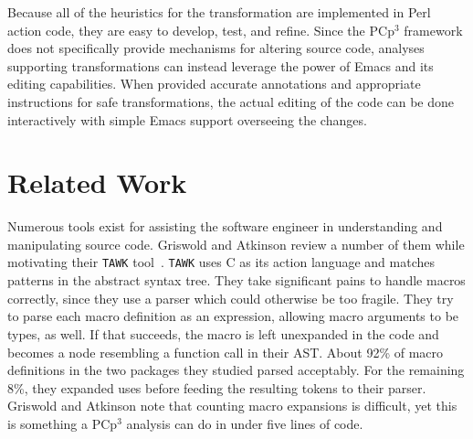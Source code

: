 \documentclass{article}
\newcommand{\pcp}{\mbox{\textsf{PCp}$^3$}}
\newcommand{\Perl}{\mbox{Perl}}
\newcommand{\C}{\mbox{C}}
\begin{document}
Because all of the heuristics for the transformation are implemented in
\Perl{} action code, they are easy to develop, test, and refine.  Since
the \pcp{} framework does not specifically provide mechanisms for
altering source code, analyses supporting transformations can instead
leverage the power of Emacs and its editing capabilities.  When provided
accurate annotations and appropriate instructions for safe
transformations, the actual editing of the code can be done
interactively with simple Emacs support overseeing the changes.



\section{Related Work}
\label{sec:related}
Numerous tools exist for assisting the software engineer in
understanding and manipulating source code.  Griswold and Atkinson
review a number of them while motivating their \texttt{TAWK} tool~\cite{Griswold96}.
\texttt{TAWK} uses \C{} as its action language and matches patterns in
the abstract syntax tree.  They take significant pains to handle macros
correctly, since they use a parser which could otherwise be too
fragile.  They try to parse each macro definition as an expression,
allowing macro arguments to be types, as well.  If that succeeds, the
macro is left unexpanded in the code and becomes a node resembling a
function call in their AST.  About 92\% of macro definitions in the two packages
they studied parsed acceptably.  For the remaining 8\%, they expanded
uses before feeding the resulting tokens to their parser.  Griswold and
Atkinson note that counting macro expansions is difficult, yet this is
something a \pcp{} analysis can do in under five lines of code.
\end{document}
